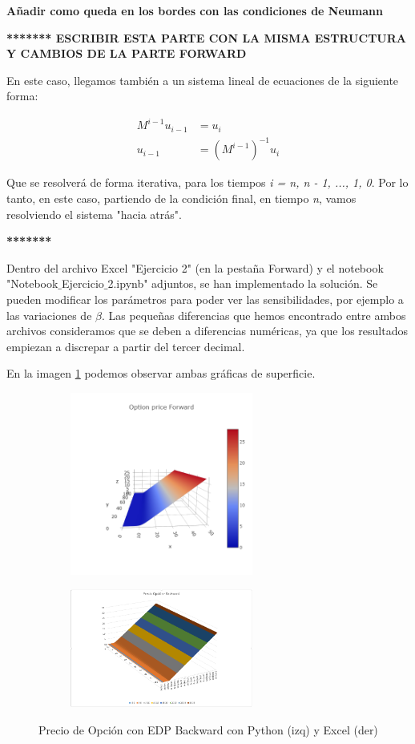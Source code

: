\documentclass[titlepage, 10pt,]{article}
\begin{document}
\textbf{Añadir como queda en los bordes con las condiciones de Neumann}



\textbf{******* ESCRIBIR ESTA PARTE CON LA MISMA ESTRUCTURA Y CAMBIOS DE LA PARTE FORWARD}

En este caso, llegamos también a un sistema lineal de ecuaciones de la siguiente forma:

\begin{align*}
	M^{i-1}u_{i-1} &= u_{i} \\
	u_{i-1} &= (M^{i-1})^{-1} u_{i}
\end{align*}

Que se resolverá de forma iterativa, para los tiempos \textit{i = n, n - 1, ..., 1, 0}. Por lo tanto, en este caso, partiendo de la condición final, en tiempo \textit{n}, vamos resolviendo el sistema "hacia atrás".


\textbf{*******}


\vspace{5pt}
Dentro del archivo Excel "Ejercicio 2" (en la pestaña Forward) y el notebook "Notebook$\_$Ejercicio$\_$2.ipynb" adjuntos, se han implementado la solución. Se pueden modificar los parámetros para poder ver las sensibilidades, por ejemplo a las variaciones de $\beta$. Las pequeñas diferencias que hemos encontrado entre ambos archivos consideramos que se deben a diferencias numéricas, ya que los resultados empiezan a discrepar a partir del tercer decimal.

\vspace{5pt}
En la imagen \ref{fig: EDP Backward} podemos observar ambas gráficas de superficie.

\begin{figure}[h]
	\begin{subfigure}{7cm}
    	\centering\includegraphics[width=6cm]{PyEDPBackward}
  	\end{subfigure}
  	\begin{subfigure}{7cm}
    	\centering\includegraphics[width=6cm]{ExEDPBackward}
  	\end{subfigure}
  	\caption{Precio de Opción con EDP Backward con Python (izq) y Excel (der)}
  	\label{fig: EDP Backward}
\end{figure}
\end{document}
